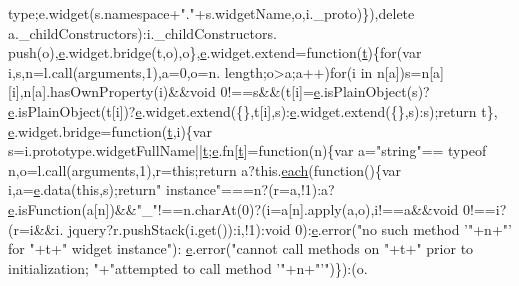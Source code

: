 \begin{DoxyCode}
      type;e.widget(s.namespace+\textcolor{stringliteral}{"."}+s.widgetName,o,i.\_proto)\}),\textcolor{keyword}{delete} a.\_childConstructors):i.\_childConstructors.
      push(o),\hyperlink{jquery-ui_8min_8js_a2c038346d47955cbe2cb91e338edd7e1}{e}.widget.bridge(t,o),o\},\hyperlink{jquery-ui_8min_8js_a2c038346d47955cbe2cb91e338edd7e1}{e}.widget.extend=\textcolor{keyword}{function}(\hyperlink{jquery-2_80_83_8min_8js_aaccc9105df5383111407fd5b41255e23}{t})\{\textcolor{keywordflow}{for}(var i,s,n=l.call(arguments,1),a=0,o=n.
      length;o>a;a++)\textcolor{keywordflow}{for}(i in n[a])s=n[a][i],n[a].hasOwnProperty(i)&&\textcolor{keywordtype}{void} 0!==s&&(t[i]=\hyperlink{jquery-ui_8min_8js_a2c038346d47955cbe2cb91e338edd7e1}{e}.isPlainObject(s)?
      \hyperlink{jquery-ui_8min_8js_a2c038346d47955cbe2cb91e338edd7e1}{e}.isPlainObject(t[i])?\hyperlink{jquery-ui_8min_8js_a2c038346d47955cbe2cb91e338edd7e1}{e}.widget.extend(\{\},t[i],s):\hyperlink{jquery-ui_8min_8js_a2c038346d47955cbe2cb91e338edd7e1}{e}.widget.extend(\{\},s):s);\textcolor{keywordflow}{return} t\},
      \hyperlink{jquery-ui_8min_8js_a2c038346d47955cbe2cb91e338edd7e1}{e}.widget.bridge=\textcolor{keyword}{function}(\hyperlink{jquery-2_80_83_8min_8js_aaccc9105df5383111407fd5b41255e23}{t},i)\{var s=i.prototype.widgetFullName||\hyperlink{jquery-2_80_83_8min_8js_aaccc9105df5383111407fd5b41255e23}{t};\hyperlink{jquery-ui_8min_8js_a2c038346d47955cbe2cb91e338edd7e1}{e}.fn[\hyperlink{jquery-2_80_83_8min_8js_aaccc9105df5383111407fd5b41255e23}{t}]=\textcolor{keyword}{function}(n)\{var a=\textcolor{stringliteral}{"string"}==
      typeof n,o=l.call(arguments,1),r=\textcolor{keyword}{this};\textcolor{keywordflow}{return} a?this.\hyperlink{jquery-2_80_83_8min_8js_acac159895212e159f5cbd2080cc4d737}{each}(\textcolor{keyword}{function}()\{var i,a=\hyperlink{jquery-ui_8min_8js_a2c038346d47955cbe2cb91e338edd7e1}{e}.data(\textcolor{keyword}{this},s);\textcolor{keywordflow}{return}\textcolor{stringliteral}{"
      instance"}===n?(r=a,!1):a?\hyperlink{jquery-ui_8min_8js_a2c038346d47955cbe2cb91e338edd7e1}{e}.isFunction(a[n])&&\textcolor{stringliteral}{"\_"}!==n.charAt(0)?(i=a[n].apply(a,o),i!==a&&\textcolor{keywordtype}{void} 0!==i?(r=i&&i.
      jquery?r.pushStack(i.get()):i,!1):void 0):\hyperlink{jquery-ui_8min_8js_a2c038346d47955cbe2cb91e338edd7e1}{e}.error(\textcolor{stringliteral}{"no such method '"}+n+\textcolor{stringliteral}{"' for "}+t+\textcolor{stringliteral}{" widget instance"}):
      \hyperlink{jquery-ui_8min_8js_a2c038346d47955cbe2cb91e338edd7e1}{e}.error(\textcolor{stringliteral}{"cannot call methods on "}+t+\textcolor{stringliteral}{" prior to initialization; "}+\textcolor{stringliteral}{"attempted to call method '"}+n+\textcolor{stringliteral}{"'"})\}):(o.

\end{DoxyCode}
